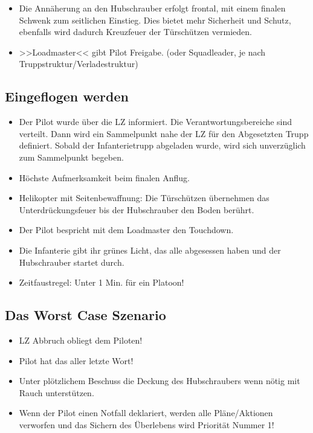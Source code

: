 \begin{itemize}
		\item Die Annäherung an den Hubschrauber erfolgt frontal, mit einem finalen Schwenk zum seitlichen Einstieg. Dies bietet mehr Sicherheit und Schutz, ebenfalls wird dadurch Kreuzfeuer der Türschützen vermieden.

		\item >>Loadmaster<< gibt Pilot Freigabe. (oder Squadleader, je nach Truppstruktur/Verladestruktur)
	\end{itemize}

\subsection{Eingeflogen werden}
	\begin{itemize} 
		\item Der Pilot wurde über die LZ informiert. Die Verantwortungsbereiche sind verteilt. Dann wird ein Sammelpunkt nahe der LZ für den Abgesetzten Trupp definiert. Sobald der Infanterietrupp abgeladen wurde, wird sich unverzüglich zum Sammelpunkt begeben.

		\item Höchste Aufmerksamkeit beim finalen Anflug.

		\item Helikopter mit Seitenbewaffnung: Die Türschützen übernehmen das Unterdrückungsfeuer bis der Hubschrauber den Boden berührt.

		\item Der Pilot bespricht mit dem Loadmaster den Touchdown.

		\item Die Infanterie gibt ihr grünes Licht, das alle abgesessen haben und der Hubschrauber startet durch.

		\item Zeitfaustregel: Unter 1 Min. für ein Platoon!
	\end{itemize}

\subsection{Das Worst Case Szenario}
	\begin{itemize}
		\item LZ Abbruch obliegt dem Piloten!

		\item Pilot hat das aller letzte Wort!

		\item Unter plötzlichem Beschuss die Deckung des Hubschraubers wenn nötig mit Rauch unterstützen.

		\item Wenn der Pilot einen Notfall deklariert, werden alle Pläne/Aktionen verworfen und das Sichern des Überlebens wird Priorität Nummer 1!

	\end{itemize}

